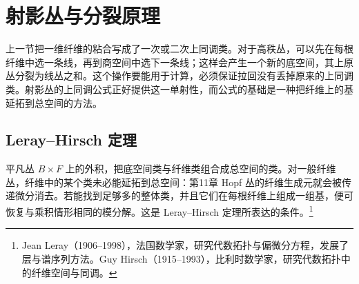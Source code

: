 
% 
% 

\section{射影丛与分裂原理}
\label{g2:sec:2102}

上一节把一维纤维的粘合写成了一次或二次上同调类。对于高秩丛，可以先在每根纤维中选一条线，再到商空间中选下一条线；这样会产生一个新的底空间，其上原丛分裂为线丛之和。这个操作要能用于计算，必须保证拉回没有丢掉原来的上同调类。射影丛的上同调公式正好提供这一单射性，而公式的基础是一种把纤维上的基延拓到总空间的方法。

\subsection{Leray–Hirsch 定理}
\label{g2:subsec:2102:01}
平凡丛 \(B\times F\) 上的外积，把底空间类与纤维类组合成总空间的类。对一般纤维丛，纤维中的某个类未必能延拓到总空间：第11章 Hopf 丛的纤维生成元就会被传递微分消去。若能找到足够多的整体类，并且它们在每根纤维上组成一组基，便可恢复与乘积情形相同的模分解。这是 Leray--Hirsch 定理所表达的条件。\footnote{Jean Leray（1906--1998），法国数学家，研究代数拓扑与偏微分方程，发展了层与谱序列方法。Guy Hirsch（1915--1993），比利时数学家，研究代数拓扑中的纤维空间与同调。}

